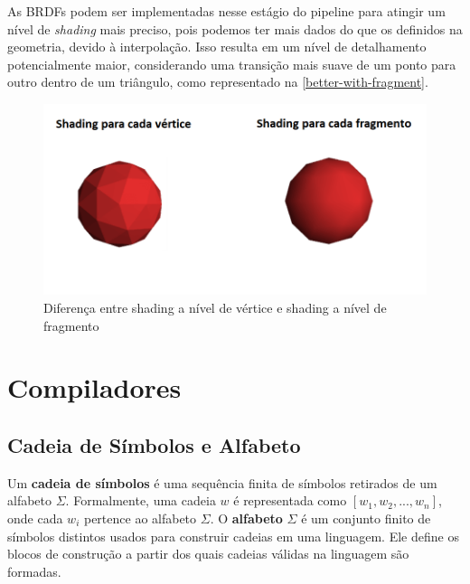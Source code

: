 \documentclass[english, 
               brazil, 
               bsc] %
               {dcomp-abntex2}
\begin{document}
As BRDFs podem ser implementadas nesse estágio do pipeline para atingir um nível de \textit{shading} mais preciso, pois podemos ter mais dados do que os definidos na geometria, devido à interpolação. Isso resulta em um nível de detalhamento potencialmente maior, considerando uma transição mais suave de um ponto para outro dentro de um triângulo,  como representado na \autoref{better-with-fragment}.




\begin{figure}[H]
        \caption{\label{better-with-fragment} \small Diferença entre shading a nível de vértice e shading a nível de fragmento}
        \begin{center}
            \includegraphics[scale=0.5]{./Imagens/per_vertex_per_frag.png}
        \end{center}
\end{figure}


\section{Compiladores} \label{compiladores}


\subsection{Cadeia de Símbolos e Alfabeto} \label{símbolos}


Um \textbf{cadeia de símbolos} é uma sequência finita de símbolos retirados de um alfabeto $ \Sigma $. Formalmente, uma cadeia $ w $ é representada como $ [w_1, w_2, ..., w_n] $, onde cada $ w_i $ pertence ao alfabeto $ \Sigma $. O \textbf{alfabeto} $ \Sigma $ é um conjunto finito de símbolos distintos usados para construir cadeias em uma linguagem. Ele define os blocos de construção a partir dos quais cadeias válidas na linguagem são formadas.
\end{document}
